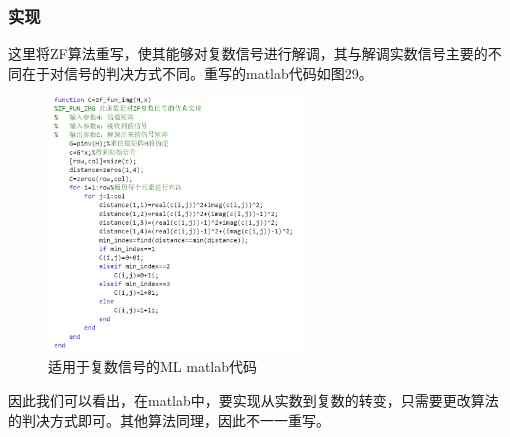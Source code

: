 \documentclass[a4paper,12pt]{article}
\begin{document}
	\subsubsection{实现}
	这里将ZF算法重写，使其能够对复数信号进行解调，其与解调实数信号主要的不同在于对信号的判决方式不同。重写的matlab代码如图29。\par
	\begin{figure}[h]
		\centering
		\includegraphics[width=0.6\textwidth]{30.png}
		\caption{适用于复数信号的ML matlab代码}
	\end{figure}
	因此我们可以看出，在matlab中，要实现从实数到复数的转变，只需要更改算法的判决方式即可。其他算法同理，因此不一一重写。
\end{document}
